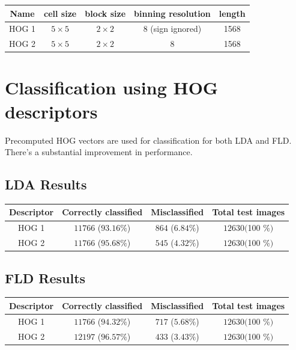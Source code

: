 \documentclass[a4paper]{article}
\begin{document}
\begin{center}
\begin{tabular}{ |c|c|c|c|c| } 
 \hline
 Name & cell size & block size &  binning resolution & length  \\ 
 \hline
 HOG 1 & $5\times 5$ & $2\times 2$ & $8$ (sign ignored)& 1568\\ 
 \hline
 HOG 2 & $5 \times 5$ & $2\times 2$ & $8$ & 1568 \\ 
 \hline


\end{tabular}
\end{center}

\section{Classification using HOG descriptors}
Precomputed HOG vectors are used for classification for both LDA and FLD. There's a substantial improvement in performance.
\subsection{LDA Results}
\begin{center}
\begin{tabular}{ |c|c|c|c| } 
 \hline
 Descriptor &Correctly classified & Misclassified & Total test images \\ 
 \hline
 HOG 1 &$11766$ ($93.16 \%$) & $864$ ($6.84 \%$) & $12630 ($100 \%$)$ \\
\hline
 HOG 2 &$11766$ ($95.68 \%$) & $545$ ($4.32 \%$) & $12630 ($100 \%$)$ \\
 \hline


\end{tabular}
\end{center}

\subsection{FLD Results}
\begin{center}
\begin{tabular}{ |c|c|c|c| } 
 \hline
 Descriptor &Correctly classified & Misclassified & Total test images \\ 
 \hline
 HOG 1 &$11766$ ($ 94.32 \%$) & $717$ ($5.68 \%$) & $12630 ($100 \%$)$ \\
\hline
 HOG 2 &$12197$ ($96.57 \%$) & $433$ ($3.43 \%$) & $12630 ($100 \%$)$ \\
 \hline

\end{tabular}
\end{center}
\end{document}
